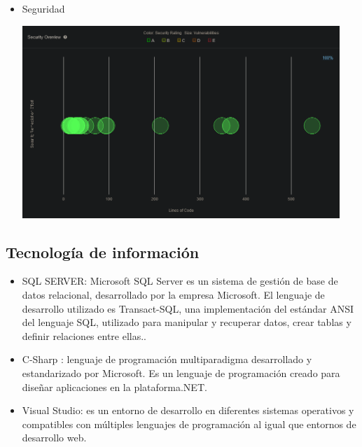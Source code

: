 \documentclass[preprint,12pt]{elsarticle}
\begin{document}
\begin{itemize}
		\item Seguridad
	\begin{center}
	\includegraphics[width=12cm]{./imagen/Screenshot_2020-10-30 Security Overview.png} 
	\end{center}
	
\end{itemize}


\subsection{\textbf{Tecnología de información  }}
		\begin{itemize}
	\item 	SQL SERVER: Microsoft SQL Server es un sistema de gestión de base de datos relacional, desarrollado por la empresa Microsoft. El lenguaje de desarrollo utilizado es Transact-SQL, una implementación del estándar ANSI del lenguaje SQL, utilizado para manipular y recuperar datos, crear tablas y definir relaciones entre ellas..
	\item 	C-Sharp : lenguaje de programación multiparadigma desarrollado y estandarizado por Microsoft. Es un lenguaje de programación creado para diseñar aplicaciones en la plataforma.NET.
	\item 	Visual Studio: es un entorno de desarrollo en diferentes sistemas operativos y compatibles con múltiples lenguajes de programación al igual que entornos de desarrollo web. 
	\end{itemize}
\end{document}
